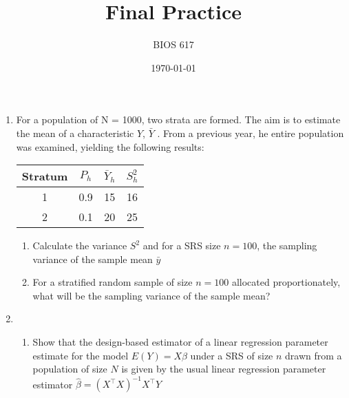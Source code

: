 \documentclass[12pt]{article}
\begin{document}
\title{Final Practice}
\author{BIOS 617}
\date{\today}

\maketitle

\begin{enumerate}
\setlength{\itemsep}{15pt}%
\setlength{\parskip}{15pt}%

\item For a population of N = 1000, two strata are formed. The aim is to estimate the mean of a characteristic $Y$, $\bar Y$ . From a previous year, he entire population was examined, yielding the following results:

\begin{table}[!th]
\centering
\begin{tabular}{c c c c}
\hline
Stratum & $P_h$ & $\bar Y_h$ & $S_h^2$ \\ \hline
1 & 0.9 & 15 & 16 \\
2 & 0.1 & 20 & 25 \\ \hline
\end{tabular}
\end{table}

\begin{enumerate}
	\item Calculate the variance $S^2$ and for a SRS size $n=100$, the sampling variance of the sample mean $\bar y$
	\vspace{2in}

	\item For a stratified random sample of size $n=100$ allocated proportionately, what will be the sampling variance of the sample mean?
\end{enumerate}
\newpage

\item
	\begin{enumerate}
	\item Show that the design-based estimator of a linear regression parameter estimate for the model $E(Y) = X \beta$ under a SRS of size $n$ drawn from a population of size $N$ is given by the usual linear regression parameter estimator $\hat \beta = (X^\top X)^{-1} X^\top Y$
	\vspace{2.5in}


\end{enumerate}
\end{enumerate}
\end{document}
